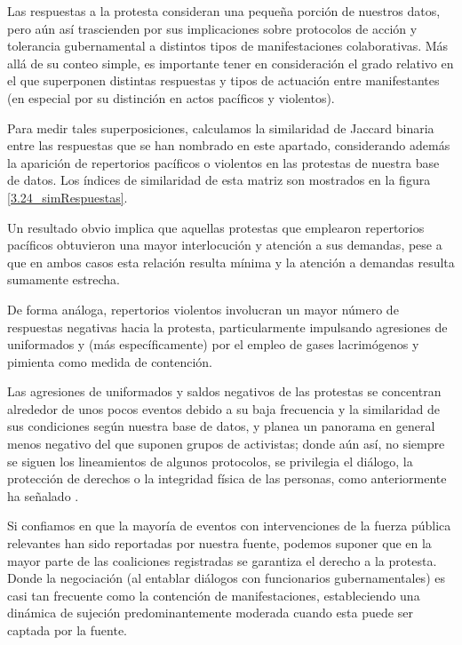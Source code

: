 \documentclass[letterpaper, 11pt]{book}
\theoremstyle{definition}
\theoremstyle{remark}
\begin{document}
Las respuestas a la protesta consideran una pequeña porción de nuestros datos, pero aún así trascienden por sus implicaciones sobre protocolos de acción y tolerancia gubernamental a distintos tipos de manifestaciones colaborativas. 
Más allá de su conteo simple, es importante tener en consideración el grado relativo en el que superponen distintas respuestas y tipos de actuación entre manifestantes (en especial por su distinción en actos pacíficos y violentos). 

Para medir tales superposiciones, calculamos la similaridad de Jaccard binaria entre las respuestas que se han nombrado en este apartado, considerando además la aparición de repertorios pacíficos o violentos en las protestas de nuestra base de datos. 
Los índices de similaridad de esta matriz son mostrados en la figura \ref{3.24_simRespuestas}. 

Un resultado obvio implica que aquellas protestas que emplearon repertorios pacíficos obtuvieron una mayor interlocución y atención a sus demandas, pese a que en ambos casos esta relación resulta mínima y la atención a demandas resulta sumamente estrecha. 

De forma análoga, repertorios violentos involucran un mayor número de respuestas negativas hacia la protesta, particularmente impulsando agresiones de uniformados y (más específicamente) por el empleo de gases lacrimógenos y pimienta como medida de contención. 

Las agresiones de uniformados y saldos negativos de las protestas se concentran alrededor de unos pocos eventos debido a su baja frecuencia y la similaridad de sus condiciones según nuestra base de datos, y planea un panorama en general menos negativo del que suponen grupos de activistas; donde aún así, no siempre se siguen los lineamientos de algunos protocolos, se privilegia el diálogo, la protección de derechos o la integridad física de las personas, como anteriormente ha señalado \citet{2017_Rob_Respuestas}. 


Si confiamos en que la mayoría de eventos con intervenciones de la fuerza pública relevantes han sido reportadas por nuestra fuente, podemos suponer que en la mayor parte de las coaliciones registradas se garantiza el derecho a la protesta. 
Donde la negociación (al entablar diálogos con funcionarios gubernamentales) es casi tan frecuente como la contención de manifestaciones, estableciendo una dinámica de sujeción predominantemente moderada cuando esta puede ser captada por la fuente. 
\end{document}
